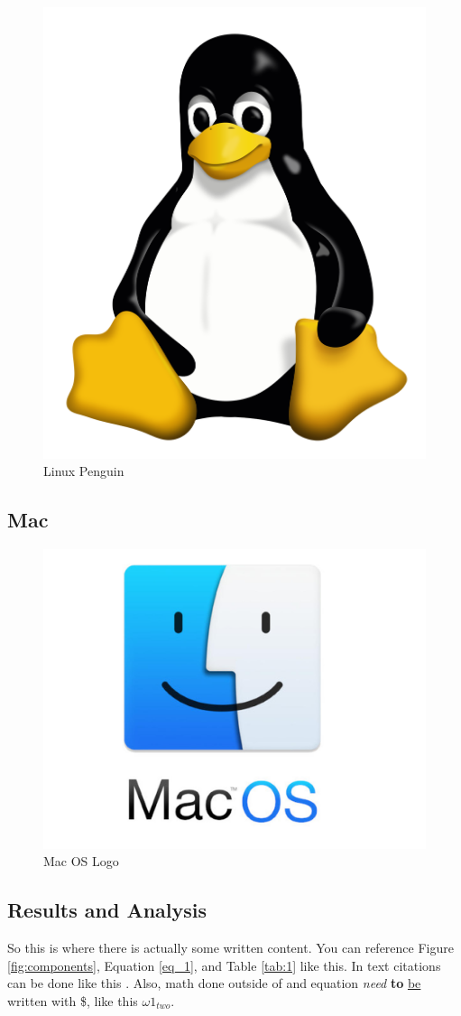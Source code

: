\documentclass[11pt]{article}
\begin{document}
\begin{figure}[H]
	\centering
	\includegraphics[width=0.25\linewidth]{Pictures/linux.png}
	\caption{Linux Penguin}
	\label{fig:lin}
\end{figure}



\subsection{Mac}
\lipsum[9]

\begin{figure}[H]
	\centering
	\includegraphics[width=0.25\linewidth]{Pictures/mac.jpg}
	\caption{Mac OS Logo}
	\label{fig:mac}
\end{figure}











\subsection{Results and Analysis}
So this is where there is actually some written content. You can reference Figure \ref{fig:components}, Equation \ref{eq_1}, and Table \ref{tab:1} like this. In text citations can be done like this \cite{b0}. Also, math done outside of and equation \textit{need} \textbf{to} \underline{be} written with \$, like this $\omega 1 _{two}$.
\end{document}
